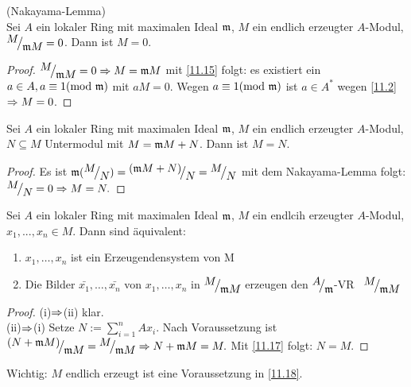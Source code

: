 \begin{sa} \label{11.16}
	(Nakayama-Lemma)\\
	Sei $ A $ ein lokaler Ring mit maximalen Ideal $\mathfrak{m}$, $M$ ein endlich erzeugter $A$-Modul, $ \QR{M}{\m M } = 0$. Dann ist $ M = 0$. 
\end{sa}
\begin{proof}
	 $ \QR{M}{\m M } = 0 \Ra M = \m M$ mit \ref{11.15} folgt: es existiert ein $a \in A, a \equiv 1 (\text{mod} \ \mathfrak{m}) $ mit $ aM = 0 $. Wegen  $a \equiv 1 (\text{mod} \ \mathfrak{m} ) $ ist $ a \in A^{*} $ wegen \ref{11.2} $\Rightarrow M = 0 $. 
\end{proof}
\begin{fo} \label{11.17}
	Sei $A$ ein lokaler Ring mit maximalen Ideal $ \mathfrak{m}$, $M$ ein endlich erzeugter $A$-Modul, $N \subseteq M $ Untermodul mit $ M = \mathfrak{m} M + N $. Dann ist $M = N $.
\end{fo}
\begin{proof}
	Es ist $ \m(\QR{M}{N}) = \QR{(\m M + N)}{N} = \QR{M}{N}$ mit dem Nakayama-Lemma folgt: $\QR{M}{N} = 0 \Ra M = N. $
\end{proof}
\begin{fo} \label{11.18}
	Sei $A$ ein lokaler Ring mit maximalen Ideal $\mathfrak{m}$, $M$ ein endlcih erzeugter $A$-Modul, $x_1,...,x_n \in M $. Dann sind äquivalent: 
	\begin{enumerate} [label= \roman*)]
		\item $x_1, \dots ,x_n $ ist ein Erzeugendensystem von M 
		\item Die Bilder $ \bar{x_1},\dots ,\bar{x_n} $ von $x_1,\dots ,x_n$ in $\QR{M}{\m M } $ erzeugen den $\QR{A}{\m} $-VR \ $\QR{M}{\m M}$
	\end{enumerate}
\end{fo}
\begin{proof}
	(i)$\Rightarrow $(ii)  klar. \\
	(ii)$\Rightarrow$(i) Setze $N:= \sum_{i = 1}^{n} A x_i.$ Nach Voraussetzung ist $ \QR{(N + \m M )}{\m M} = \QR{M}{\m M} \Ra N + \m M  = M. $ Mit \ref{11.17} folgt: $N=M$.
\end{proof}
\begin{anm}
	Wichtig: $M$ endlich erzeugt ist eine Voraussetzung in \ref{11.18}.
\end{anm}


